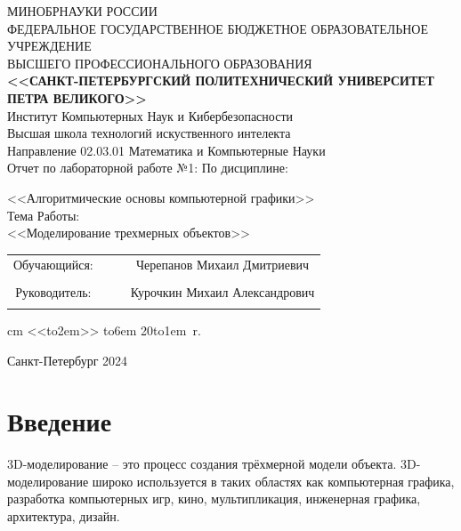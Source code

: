 \documentclass[12pt]{article}
\begin{document}
\begin{center}
\hfill \break
\large{МИНОБРНАУКИ РОССИИ} \\
\hfill \break
\small {ФЕДЕРАЛЬНОЕ ГОСУДАРСТВЕННОЕ БЮДЖЕТНОЕ ОБРАЗОВАТЕЛЬНОЕ УЧРЕЖДЕНИЕ }\\
\small { ВЫСШЕГО ПРОФЕССИОНАЛЬНОГО ОБРАЗОВАНИЯ  } \\
\hfill \break
\normalsize {\textbf{ <<САНКТ-ПЕТЕРБУРГСКИЙ ПОЛИТЕХНИЧЕСКИЙ УНИВЕРСИТЕТ } }\\
{\normalsize {\textbf { ПЕТРА ВЕЛИКОГО>>}}} \\
\hfill \break
\large{Институт Компьютерных Наук и Кибербезопасности }\\
\hfill \break
\large{ Высшая школа технологий искуственного интелекта }\\
\hfill \break
Направление 02.03.01 Математика и Компьютерные Науки\\
\vskip 1cm
\large {Отчет по лабораторной работе №1:}
\vskip 0.2cm
\large {По дисциплине:}

\large{<<Алгоритмические основы компьютерной графики>>} \\
\hfill \break
\normalsize{Тема Работы:} \\
\hfill \break
\normalsize{<<Моделирование трехмерных объектов>>} \\
\thispagestyle {empty}

\hfill \break
\vskip 0.3cm
\vskip 1cm
\end{center}
\begin {tabular}{cccc}
\hspace{0.5cm}Обучающийся: &\underline {\hspace{3cm}} &  &Черепанов Михаил Дмитриевич\\\\
\hspace{0.5cm}Руководитель: &\underline {\hspace{3cm}} & &Курочкин Михаил Александрович\\\\
\end{tabular}
 cm
\hspace{9cm}\def \hrf#1{\hbox to#1{\hrulefill}}<<\hrf{2em}>>  \hrf{6em}  20\hrf{1em}~r.
\vskip 2cm
\begin {center} Санкт-Петербург 2024 \end{center}
\newpage
\tableofcontents
\newpage






\section*{Введение}
3D-моделирование – это процесс создания трёхмерной модели объекта. 3D-моделирование
широко используется в таких областях как компьютерная графика, разработка компьютерных игр, кино, мультипликация, инженерная графика, архитектура, дизайн.
\end{document}
